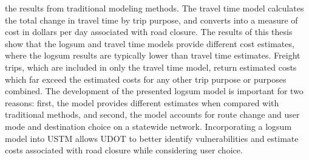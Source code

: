the results from traditional modeling methods.
The travel time model calculates the total change in travel time by trip purpose,
and converts into a measure of cost in dollars per day associated with road closure.
The results of this thesis show that the logsum and travel time models
provide different cost estimates, where the logsum results are typically lower
than travel time estimates. Freight trips, which are included in
only the travel time model, return estimated costs which far exceed the estimated
costs for any other trip purpose or purposes combined.
The development of the presented logsum model is important for two reasons:
first, the model provides different estimates when compared with traditional methods, and
second, the model accounts for route change and user mode and destination choice on a statewide network.
Incorporating a logsum model into USTM allows UDOT to better identify
vulnerabilities and estimate costs associated with road closure while considering user choice.
